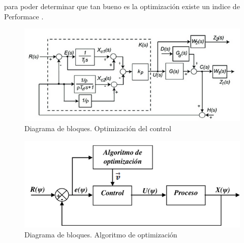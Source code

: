 \documentclass[12pt,letterpaper]{article}
\begin{document}
para poder determinar que tan bueno es la optimización existe un indice de Performace \cite{Mariano}.

\begin{figure}[H]
    \centering
    \includegraphics[scale=0.55]{EL5841_reporte/im12.png}
    \caption{Diagrama de bloques. Optimización del control \cite{Goncalves}}   \label{fig:MV4}
\end{figure}

\begin{figure}[H]
    \centering
    \includegraphics[scale=0.55]{EL5841_reporte/im13.png}
    \caption{Diagrama de bloques. Algoritmo de optimización \cite{Goncalves}}   \label{fig:MV4}
\end{figure}

\\
\
\

\end{document}
